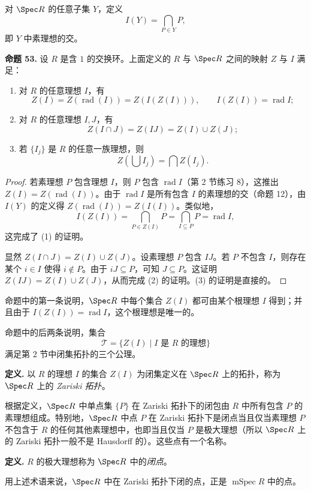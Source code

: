 对 $\Spec R$ 的任意子集 $Y$，定义
\[
I(Y)=\bigcap_{P\in Y}P,
\]
即 $Y$ 中素理想的交。

\noindent\textbf{命题 53.} 设 $R$ 是含 $1$ 的交换环。上面定义的 $R$ 与 $\Spec R$ 之间的映射 $Z$ 与 $I$ 满足：
\begin{enumerate}[label=(\arabic*)]
	\item 对 $R$ 的任意理想 $I$，有
	\[
	Z(I)=Z(\operatorname{rad}(I))=Z(I(Z(I))),
	\qquad
	I(Z(I))=\operatorname{rad} I;
	\]
	\item 对 $R$ 的任意理想 $I,J$，有
	\[
	Z(I\cap J)=Z(IJ)=Z(I)\cup Z(J);
	\]
	\item 若 $\{I_j\}$ 是 $R$ 的任意一族理想，则
	\[
	Z\left(\bigcup I_j\right)=\bigcap Z(I_j).
	\]
\end{enumerate}

\begin{proof}
	若素理想 $P$ 包含理想 $I$，则 $P$ 包含 $\operatorname{rad}I$（第 2 节练习 8），这推出 $Z(I)=Z(\operatorname{rad}(I))$。由于 $\operatorname{rad}I$ 是所有包含 $I$ 的素理想的交（命题 12），由 $I(Y)$ 的定义得 $Z(\operatorname{rad}(I))=Z(I(I))$。类似地，
	\[
	I(Z(I))=\bigcap_{P\in Z(I)}P
	=\bigcap_{I\subseteq P}P
	=\operatorname{rad}I,
	\]
	这完成了 (1) 的证明。
	
	显然 $Z(I\cap J)=Z(I)\cup Z(J)$。设素理想 $P$ 包含 $IJ$。若 $P$ 不包含 $I$，则存在某个 $i\in I$ 使得 $i\notin P$。由于 $iJ\subseteq P$，可知 $J\subseteq P$。这证明 $Z(IJ)=Z(I)\cup Z(J)$，从而完成 (2) 的证明。(3) 的证明是直接的。
\end{proof}

命题中的第一条说明，$\Spec R$ 中每个集合 $Z(I)$ 都可由某个根理想 $I$ 得到；并且由于 $I(Z(I))=\operatorname{rad}I$，这个根理想是唯一的。

命题中的后两条说明，集合
\[
\mathcal T=\{Z(I)\mid I\text{ 是 }R\text{ 的理想}\}
\]
满足第 2 节中闭集拓扑的三个公理。

\noindent\textbf{定义.} 以 $R$ 的理想 $I$ 的集合 $Z(I)$ 为闭集定义在 $\Spec R$ 上的拓扑，称为 $\Spec R$ 上的 \emph{Zariski 拓扑}。

根据定义，$\Spec R$ 中单点集 $\{P\}$ 在 Zariski 拓扑下的闭包由 $R$ 中所有包含 $P$ 的素理想组成。特别地，$\Spec R$ 中点 $P$ 在 Zariski 拓扑下是闭点当且仅当素理想 $P$ 不包含于 $R$ 的任何其他素理想中，也即当且仅当 $P$ 是极大理想（所以 $\Spec R$ 上的 Zariski 拓扑一般不是 Hausdorff 的）。这些点有一个名称。

\noindent\textbf{定义.} $R$ 的极大理想称为 $\Spec R$ 中的\emph{闭点}。

用上述术语来说，$\Spec R$ 中在 Zariski 拓扑下闭的点，正是 $\operatorname{mSpec}R$ 中的点。

